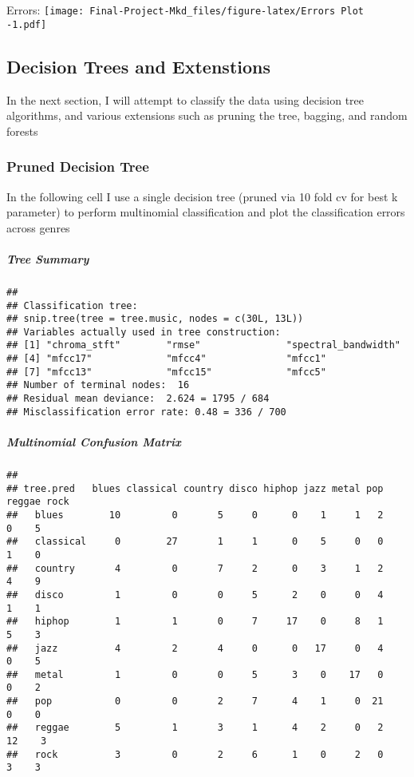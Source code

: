 \documentclass[
]{article}
\begin{document}
Errors:
\texttt{[image: Final-Project-Mkd\_files/figure-latex/Errors Plot -1.pdf]}

\hypertarget{decision-trees-and-extenstions}{%
\subsection{Decision Trees and
Extenstions}\label{decision-trees-and-extenstions}}

In the next section, I will attempt to classify the data using decision
tree algorithms, and various extensions such as pruning the tree,
bagging, and random forests

\hypertarget{pruned-decision-tree}{%
\subsubsection{Pruned Decision Tree}\label{pruned-decision-tree}}

In the following cell I use a single decision tree (pruned via 10 fold
cv for best k parameter) to perform multinomial classification and plot
the classification errors across genres

\hypertarget{tree-summary}{%
\subparagraph{Tree Summary}\label{tree-summary}}

\begin{verbatim}
## 
## Classification tree:
## snip.tree(tree = tree.music, nodes = c(30L, 13L))
## Variables actually used in tree construction:
## [1] "chroma_stft"        "rmse"               "spectral_bandwidth"
## [4] "mfcc17"             "mfcc4"              "mfcc1"             
## [7] "mfcc13"             "mfcc15"             "mfcc5"             
## Number of terminal nodes:  16 
## Residual mean deviance:  2.624 = 1795 / 684 
## Misclassification error rate: 0.48 = 336 / 700
\end{verbatim}

\hypertarget{multinomial-confusion-matrix}{%
\subparagraph{Multinomial Confusion
Matrix}\label{multinomial-confusion-matrix}}

\begin{verbatim}
##            
## tree.pred   blues classical country disco hiphop jazz metal pop reggae rock
##   blues        10         0       5     0      0    1     1   2      0    5
##   classical     0        27       1     1      0    5     0   0      1    0
##   country       4         0       7     2      0    3     1   2      4    9
##   disco         1         0       0     5      2    0     0   4      1    1
##   hiphop        1         1       0     7     17    0     8   1      5    3
##   jazz          4         2       4     0      0   17     0   4      0    5
##   metal         1         0       0     5      3    0    17   0      0    2
##   pop           0         0       2     7      4    1     0  21      0    0
##   reggae        5         1       3     1      4    2     0   2     12    3
##   rock          3         0       2     6      1    0     2   0      3    3
\end{verbatim}
\end{document}
